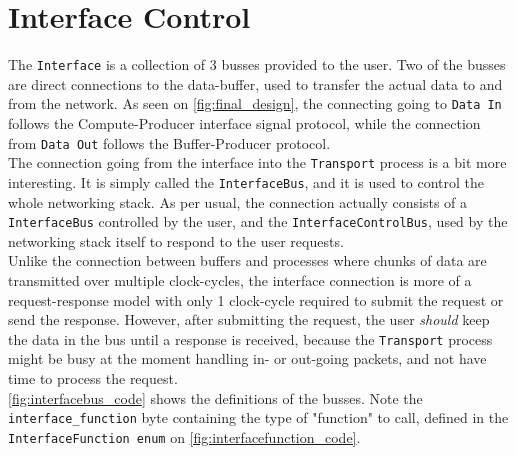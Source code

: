 \section{Interface Control}
The \texttt{Interface} is a collection of 3 busses provided to the user. Two of
the busses are direct connections to the data-buffer, used to transfer the
actual data to and from the network. As seen on \autoref{fig:final_design}, the
connecting going to \texttt{Data In} follows the Compute-Producer interface
signal protocol, while the connection from \texttt{Data Out} follows the
Buffer-Producer protocol.\\
The connection going from the interface into the \texttt{Transport} process is
a bit more interesting. It is simply called the \texttt{InterfaceBus}, and it
is used to control the whole networking stack. As per usual, the connection
actually consists of a \texttt{InterfaceBus} controlled by the user, and the
\texttt{InterfaceControlBus}, used by the networking stack itself to respond to
the user requests.\\
Unlike the connection between buffers and processes where chunks of data are
transmitted over multiple clock-cycles, the interface connection is more of a
request-response model with only 1 clock-cycle required to submit the request
or send the response. However, after submitting the request, the user
\textit{should} keep the data in the bus until a response is received, because
the \texttt{Transport} process might be busy at the moment handling in- or
out-going packets, and not have time to process the request.\\
\autoref{fig:interfacebus_code} shows the definitions of the busses. Note
the \texttt{interface\_function} byte containing the type of "function" to
call, defined in the \texttt{InterfaceFunction enum} on
\autoref{fig:interfacefunction_code}.


